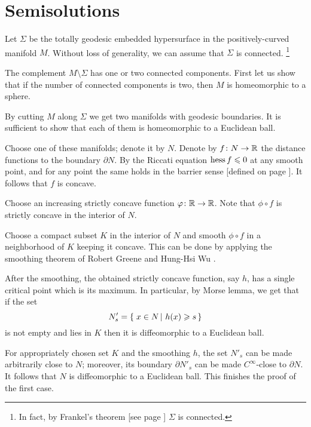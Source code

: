 \section*{Semisolutions}



Let $\Sigma$ be the totally geodesic embedded hypersurface in the positively-curved manifold $M$.
Without loss of generality, we can assume that $\Sigma$ is connected.%
\footnote{In fact, by Frankel's theorem [see page \pageref{page:frankel}] $\Sigma$ is connected.}

The complement $M\setminus\Sigma$ has one or two connected components.
First let us show that if the number of connected components is two, 
then $M$ is homeomorphic to a sphere.

By cutting $M$ along $\Sigma$ 
we get two manifolds
with geodesic boundaries.
It is sufficient to show that each of them is homeomorphic to a Euclidean ball.

Choose one of these manifolds; denote it by $N$.
Denote by $f\:N\z\to\RR$ the distance functions to the boundary $\partial N$.
By the Riccati equation $\operatorname{\rm hess}\nolimits f\leqslant 0$ at any smooth point,
and for any point the same holds in the barrier sense [defined on page \pageref{page:barrier sense}].
It follows that $f$ is concave.

Choose an increasing strictly concave function $\varphi\colon\mathbb{R}\to\mathbb{R}$.
Note that $\phi\circ f$ is strictly concave in the interior of $N$.

Choose a compact subset $K$ in the interior of $N$ and
smooth $\phi\circ f$ in a neighborhood of $K$ keeping it concave. 
This can be done by applying the smoothing theorem of Robert Greene and Hung-Hsi Wu \cite[Theorem~2]{greene-wu}.

After the smoothing, the obtained strictly concave function, say $h$, has a single critical point which is its maximum.
In particular, by Morse lemma, we get that if the set  
\[N'_s=\set{x\in N}{h(x)\ge s}\]
is not empty and lies in $K$ then it is diffeomorphic to a Euclidean ball.

For appropriately chosen set $K$ and the smoothing $h$, the set $N'_s$ can be made arbitrarily close to $N$;
moreover, its boundary $\partial N'_s$ can be made $C^\infty$-close to $\partial N$.
It follows that $N$ is diffeomorphic to a Euclidean ball.
This finishes the proof of the first case.

